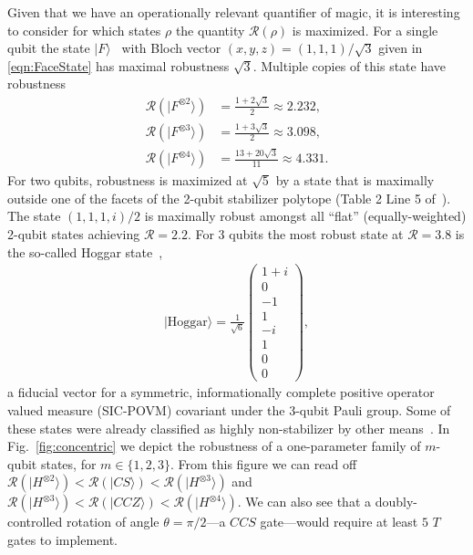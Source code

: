 \documentclass[aps,prl,twocolumn,showpacs,superscriptaddress,groupedaddress,amsmath,amssymb]{revtex4-1}  %
\def\ket #1{\vert #1\rangle}
\begin{document}
Given that we have an operationally relevant quantifier of magic, it is interesting to consider for which states $\rho$ the quantity $\mathcal{R}(\rho)$ is maximized. For a single qubit the state $\ket{F}$~\cite{bravyi_universal_2005} with Bloch vector $(x,y,z)=(1,1,1)/\sqrt{3}$ given in \eqref{eqn:FaceState} has maximal robustness $\sqrt{3}$. Multiple copies of this state have robustness
\begin{align}
\mathcal{R}(\ket{F^{\otimes 2}})&=\frac{1+2\sqrt{3}}{2}\approx 2.232, \\
\mathcal{R}(\ket{F^{\otimes 3}})&=\frac{1+3\sqrt{3}}{2}\approx 3.098, \\
\mathcal{R}(\ket{F^{\otimes 4}})&=\frac{13+20\sqrt{3}}{11}\approx 4.331. 
\end{align}
For two qubits, robustness is maximized at $\sqrt{5}$ by a state that is maximally outside one of the facets of the 2-qubit stabilizer polytope (Table 2 Line 5 of~\cite{reichardt_quantum_2009}). The state $(1,1,1,i)/2$ is maximally robust amongst all ``flat'' (equally-weighted) 2-qubit states achieving $\mathcal{R}=2.2$. For 3 qubits the most robust state at $\mathcal{R}=3.8$ is the so-called Hoggar state~\cite{hoggar_64_1998},
\begin{align}
\ket{\text{Hoggar}}=\frac{1}{\sqrt{6}}\left(\begin{array}{c}
1+i \\ 
0 \\ 
-1 \\ 
1 \\ 
-i \\ 
1 \\ 
0 \\ 
0
\end{array}  \right),
\end{align}
 a fiducial vector for a symmetric, informationally complete positive operator valued measure (SIC-POVM) covariant under the 3-qubit Pauli group. Some of these states were already classified as highly non-stabilizer by other means~\cite{andersson_states_2015}. In Fig.~\ref{fig:concentric} we depict the robustness of a one-parameter family of $m$-qubit states, for $m\in\{1,2,3\}$. From this figure we can read off $\mathcal{R}(\ket{H^{\otimes 2}})<\mathcal{R}(\ket{CS})<\mathcal{R}(\ket{H^{\otimes 3}})$ and 
 $\mathcal{R}(\ket{H^{\otimes 3}})<\mathcal{R}(\ket{CCZ})<\mathcal{R}(\ket{H^{\otimes 4}})$. We can also see that a doubly-controlled rotation of angle $\theta=\pi/2$---a $CCS$ gate---would require at least $5$ $T$ gates to implement.
 
\end{document}
